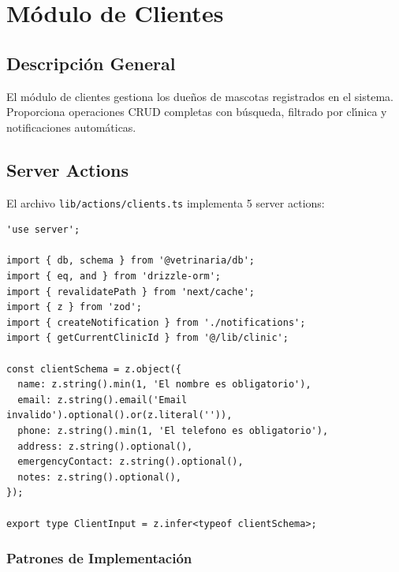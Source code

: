 \chapter{M\'odulo de Clientes}

\section{Descripci\'on General}

El m\'odulo de clientes gestiona los due\~nos de mascotas registrados en
el sistema. Proporciona operaciones CRUD completas con b\'usqueda, filtrado
por cl\'{\i}nica y notificaciones autom\'aticas.

\section{Server Actions}

El archivo \texttt{lib/actions/clients.ts} implementa 5 server actions:

\begin{lstlisting}[style=typescript, caption=Server actions de clientes]
'use server';

import { db, schema } from '@vetrinaria/db';
import { eq, and } from 'drizzle-orm';
import { revalidatePath } from 'next/cache';
import { z } from 'zod';
import { createNotification } from './notifications';
import { getCurrentClinicId } from '@/lib/clinic';

const clientSchema = z.object({
  name: z.string().min(1, 'El nombre es obligatorio'),
  email: z.string().email('Email invalido').optional().or(z.literal('')),
  phone: z.string().min(1, 'El telefono es obligatorio'),
  address: z.string().optional(),
  emergencyContact: z.string().optional(),
  notes: z.string().optional(),
});

export type ClientInput = z.infer<typeof clientSchema>;
\end{lstlisting}

\subsection{Patrones de Implementaci\'on}


